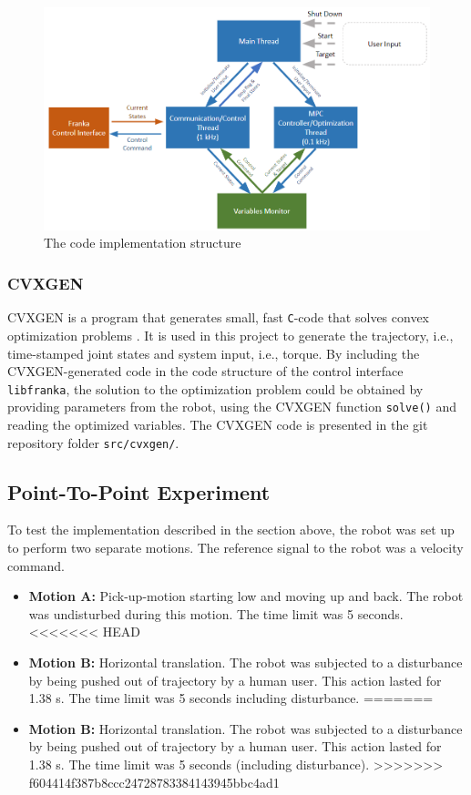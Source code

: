 \documentclass[final]{LTHtwocol} %
\begin{document}
\begin{figure}
	\centering
	\includegraphics[width=1\columnwidth]{code_structure.PNG}
	\caption{The code implementation structure}
	\label{fig:code_structure} 
\end{figure}

\subsubsection{CVXGEN}
CVXGEN is a program that generates small, fast \texttt{C}-code that solves convex optimization problems \cite{cvxgen}. It is used in this project to generate the trajectory, i.e., time-stamped joint states and system input, i.e., torque. By including the CVXGEN-generated code in the code structure of the control interface \texttt{libfranka}, the solution to the optimization problem could be obtained by providing parameters from the robot, using the CVXGEN function \texttt{solve()} and reading the optimized variables. The CVXGEN code is presented in the git repository folder \texttt{src/cvxgen/}.\cite{gitrepo} 

\subsection{Point-To-Point Experiment}
To test the implementation described in the section above, the robot was set up to perform two separate motions. The reference signal to the robot was a velocity command.
\begin{itemize}
    \item \textbf{Motion A:} Pick-up-motion starting low and moving up and back. The robot was undisturbed during this motion. The time limit was 5 seconds.
<<<<<<< HEAD
    \item \textbf{Motion B:} Horizontal translation. The robot was subjected to a disturbance by being pushed out of trajectory by a human user. This action lasted for 1.38 s. The time limit was 5 seconds including disturbance.
=======
    \item \textbf{Motion B:} Horizontal translation. The robot was subjected to a disturbance by being pushed out of trajectory by a human user. This action lasted for 1.38 s. The time limit was 5 seconds (including disturbance).
>>>>>>> f604414f387b8ccc24728783384143945bbc4ad1
\end{itemize}
\end{document}
